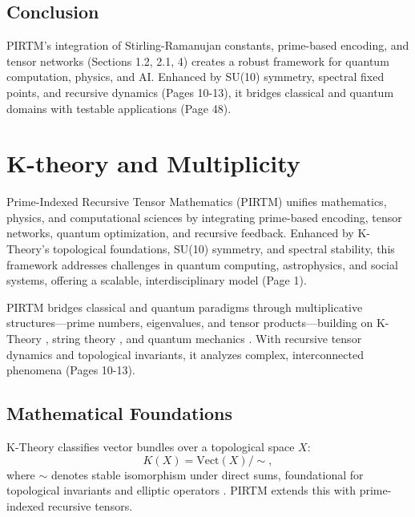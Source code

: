 \documentclass{article}
\theoremstyle{plain}
\begin{document}
\subsection{Conclusion}
PIRTM’s integration of Stirling-Ramanujan constants, prime-based encoding, and tensor networks (Sections 1.2, 2.1, 4) creates a robust framework for quantum computation, physics, and AI. Enhanced by SU(10) symmetry, spectral fixed points, and recursive dynamics (Pages 10-13), it bridges classical and quantum domains with testable applications (Page 48).





\section{K-theory and Multiplicity}

Prime-Indexed Recursive Tensor Mathematics (PIRTM) unifies mathematics, physics, and computational sciences by integrating prime-based encoding, tensor networks, quantum optimization, and recursive feedback. Enhanced by K-Theory’s topological foundations, SU(10) symmetry, and spectral stability, this framework addresses challenges in quantum computing, astrophysics, and social systems, offering a scalable, interdisciplinary model (Page 1).

PIRTM bridges classical and quantum paradigms through multiplicative structures—prime numbers, eigenvalues, and tensor products—building on K-Theory \cite{atiyah1966kTheory, karoubi1978kTheory}, string theory \cite{witten1995string}, and quantum mechanics \cite{weinberg1995quantum}. With recursive tensor dynamics and topological invariants, it analyzes complex, interconnected phenomena (Pages 10-13).

\subsection{Mathematical Foundations}
K-Theory classifies vector bundles over a topological space \( X \):
\begin{equation}
K(X) = \text{Vect}(X)/\sim,
\end{equation}
where \( \sim \) denotes stable isomorphism under direct sums, foundational for topological invariants and elliptic operators \cite{hatcher2003algebraic}. PIRTM extends this with prime-indexed recursive tensors.
\end{document}
